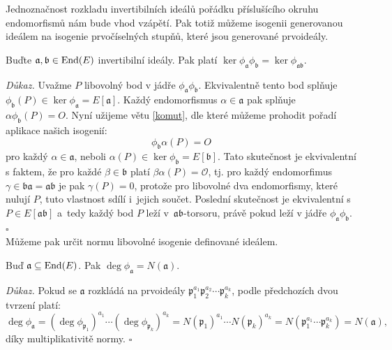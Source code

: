 \documentclass[12pt]{report}
\begin{document}
Jednoznačnost rozkladu invertibilních ideálů pořádku příslušícího okruhu endomorfismů nám bude vhod vzápětí. Pak totiž můžeme isogenii generovanou ideálem na isogenie prvočíselných stupňů, které jsou generované prvoideály.

\begin{veta}\label{multivitamin}
Buďte $\mathfrak{a},\mathfrak{b} \in \operatorname{End}(E)$ invertibilní ideály. Pak platí $\ker \phi_\mathfrak{a} \phi_\mathfrak{b} = \ker \phi_\mathfrak{ab}$.
\end{veta}
\noindent \textit{Důkaz.} Uvažme $P$ libovolný bod v jádře $\phi_{\mathfrak{a}} \phi_{\mathfrak{b}}$. Ekvivalentně tento bod splňuje $\phi_\mathfrak{b} (P) \in \ker \phi_{\mathfrak{a}} = E[\mathfrak{a}]$. Každý endomorfismus $\alpha \in \mathfrak{a}$ pak splňuje $\alpha \phi_{\mathfrak{b}} (P) = O$. Nyní užijeme větu \ref{komut}, dle které můžeme prohodit pořadí aplikace našich isogenií:
\begin{equation*}
\phi_{\mathfrak{b}} \alpha (P) =O
\end{equation*}
pro každý $\alpha \in \mathfrak{a}$, neboli $\alpha (P) \in \ker \phi_{\mathfrak{b}} = E[\mathfrak{b}]$.  Tato skutečnost je ekvivalentní s faktem, že pro každé $\beta \in \mathfrak{b}$ platí $\beta \alpha (P) = \mathcal{O}$, tj. pro každý endomorfimus $\gamma \in \mathfrak{ba} = \mathfrak{ab}$ je pak $\gamma (P) = 0$, protože pro libovolné dva endomorfismy, které nulují $P$, tuto vlastnost sdílí i~jejich součet. Poslední skutečnost je ekvivalentní s $P \in E[\mathfrak{ab}]$ a~tedy každý bod $P$ leží v~$\mathfrak{ab}$-torsoru, právě pokud leží v jádře $\phi_{\mathfrak{a}} \phi_{\mathfrak{b}}$. \hfill $\square$\\

Můžeme pak určit normu libovolné isogenie definované ideálem.
\begin{dusledek}
Buď $\mathfrak{a} \subseteq \operatorname{End}(E)$. Pak $\deg \phi_{\mathfrak{a}} = N(\mathfrak{a})$.
\end{dusledek}
\noindent \textit{Důkaz.} Pokud se $\mathfrak{a}$ rozkládá na prvoideály $\mathfrak{p}_{1} ^{a_1} \mathfrak{p}_2 ^{a_2} \cdots \mathfrak{p}_{k} ^{a_k}$, podle předchozích dvou tvrzení platí: 
\begin{equation*}
\deg \phi_{\mathfrak{a}} = (\deg \phi_{\mathfrak{p}_1} )^{a_1} \cdots (\deg \phi_{\mathfrak{p}_k} )^{a_k} = N(\mathfrak{p}_1)^{a_1} \cdots N(\mathfrak{p}_k)^{a_k} = N(\mathfrak{p}_1 ^{a_1} \cdots \mathfrak{p}_k ^{a_k}) = N(\mathfrak{a}),
\end{equation*}
díky multiplikativitě normy. \hfill $\square$\\
\end{document}
